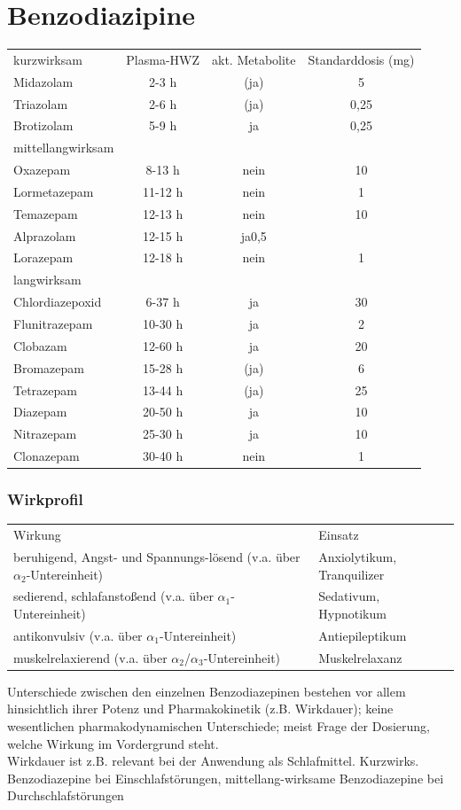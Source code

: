 \documentclass[10pt,a4paper]{report}
\begin{document}
\section{Benzodiazipine} %
\label{sec:benzodiazipine}
\begin{tabularx}{\textwidth}{lccc}
kurzwirksam&Plasma-HWZ&akt. Metabolite&Standarddosis (mg)\\
Midazolam&2-3 h&(ja)&5\\
Triazolam&2-6 h&(ja)&0,25\\
Brotizolam&5-9 h&ja&0,25\\
mittellangwirksam&\\
Oxazepam&8-13 h&nein&10\\
Lormetazepam&11-12 h&nein&1\\
Temazepam&12-13 h&nein&10\\
Alprazolam&12-15 h&ja0,5\\
Lorazepam&12-18 h&nein&1\\	
langwirksam&\\
Chlordiazepoxid&6-37 h&ja&30\\
Flunitrazepam&10-30 h&ja&2\\
Clobazam&12-60 h&ja&20\\
Bromazepam&15-28 h&(ja)&6\\
Tetrazepam&13-44 h&(ja)&25\\
Diazepam&20-50 h&ja&10\\
Nitrazepam&25-30 h&ja&10\\
Clonazepam&30-40 h&nein&1\\
\end{tabularx}
\subsubsection{Wirkprofil} %
\label{ssub:wirkprofil}
\begin{tabularx}{\textwidth}{XX}
Wirkung&Einsatz\\
beruhigend, Angst- und Spannungs-lösend (v.a. über $\alpha_2$-Untereinheit)&Anxiolytikum, Tranquilizer\\
sedierend, schlafanstoßend (v.a. über $\alpha_1$-Untereinheit)&Sedativum, Hypnotikum\\
antikonvulsiv (v.a. über $\alpha_1$-Untereinheit)&Antiepileptikum\\
muskelrelaxierend (v.a. über $\alpha_2$/$\alpha_3$-Untereinheit)&Muskelrelaxanz				\\
\end{tabularx}
Unterschiede zwischen den einzelnen Benzodiazepinen bestehen vor allem hinsichtlich ihrer Potenz und Pharmakokinetik (z.B. Wirkdauer); keine wesentlichen pharmakodynamischen Unterschiede; meist Frage der Dosierung, welche Wirkung im Vordergrund steht.\\ 
Wirkdauer ist z.B. relevant bei der Anwendung als Schlafmittel. Kurzwirks. Benzodiazepine bei Einschlafstörungen, mittellang-wirksame Benzodiazepine bei Durchschlafstörungen
\end{document}
